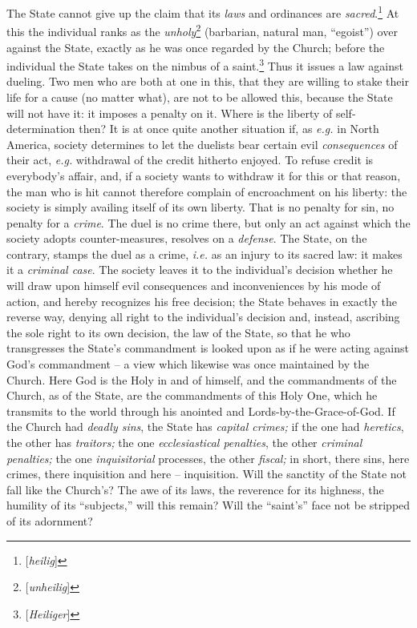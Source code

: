 \documentclass[12pt,a4paper]{book}
\begin{document}
The State cannot give up the claim that its \textit{laws} and ordinances are 
\textit{sacred}.\footnote{[\textit{heilig}]} At this the individual ranks as 
the \textit{unholy}\footnote{[\textit{unheilig}]} (barbarian, natural man, 
``egoist'') over against the State, exactly as he was once regarded by the 
Church; before the individual the State takes on the nimbus of a 
saint.\footnote{[\textit{Heiliger}]} Thus it issues a law against dueling. Two 
men who are both at one in this, that they are willing to stake their life for 
a cause (no matter what), are not to be allowed this, because the State will 
not have it: it imposes a penalty on it. Where is the liberty of 
self-determination then? It is at once quite another situation if, as 
\textit{e.g.} in North America, society determines to let the duelists bear 
certain evil \textit{consequences} of their act, \textit{e.g.} withdrawal of 
the credit hitherto enjoyed. To refuse credit is everybody's affair, and, if a 
society wants to withdraw it for this or that reason, the man who is hit 
cannot therefore complain of encroachment on his liberty: the society is 
simply availing itself of its own liberty. That is no penalty for sin, no 
penalty for a \textit{crime}. The duel is no crime there, but only an act 
against which the society adopts counter-measures, resolves on a 
\textit{defense}. The State, on the contrary, stamps the duel as a crime, 
\textit{i.e.} as an injury to its sacred law: it makes it a \textit{criminal 
case}. The society leaves it to the individual's decision whether he will draw 
upon himself evil consequences and inconveniences by his mode of action, and 
hereby recognizes his free decision; the State behaves in exactly the reverse 
way, denying all right to the individual's decision and, instead, ascribing 
the sole right to its own decision, the law of the State, so that he who 
transgresses the State's commandment is looked upon as if he were acting 
against God's commandment -- a view which likewise was once maintained by the 
Church. Here God is the Holy in and of himself, and the commandments of the 
Church, as of the State, are the commandments of this Holy One, which he 
transmits to the world through his anointed and Lords-by-the-Grace-of-God. If 
the Church had \textit{deadly sins}, the State has \textit{capital crimes;} if 
the one had \textit{heretics}, the other has \textit{traitors;} the one 
\textit{ecclesiastical penalties}, the other \textit{criminal penalties;} the 
one \textit{inquisitorial} processes, the other \textit{fiscal;} in short, 
there sins, here crimes, there inquisition and here -- inquisition. Will the 
sanctity of the State not fall like the Church's? The awe of its laws, the 
reverence for its highness, the humility of its ``subjects,'' will this 
remain? Will the ``saint's'' face not be stripped of its adornment?
\end{document}
